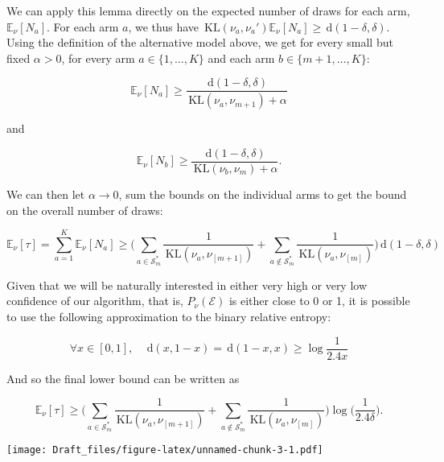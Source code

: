 \documentclass[12pt,]{article}
\newcommand{\KL}{\,\text{KL}}
\newcommand{\der}{\,\text{d}}
\begin{document}
We can apply this lemma directly on the expected number of draws for
each arm, \(\mathbb{E}_{\nu}[N_a]\). For each arm \(a\), we thus have
\(\KL(\nu_a, \nu_a') \mathbb{E}_{\nu}[N_a] \geq \der (1-\delta, \delta)\).
Using the definition of the alternative model above, we get for every
small but fixed \(\alpha > 0\), for every arm \(a \in \{1, \dots, K\}\)
and each arm \(b \in \{m+1, \dots, K\}\):

\begin{equation*}
\mathbb{E}_{\nu}[N_a] \geq \frac{\der(1-\delta, \delta)}{\KL (\nu_a, \nu_{m+1}) + \alpha}
\end{equation*}

and

\begin{equation*}
\mathbb{E}_{\nu}[N_b] \geq \frac{\der(1-\delta, \delta)}{\KL (\nu_b, \nu_{m}) + \alpha}.
\end{equation*}

We can then let \(\alpha \to 0\), sum the bounds on the individual arms
to get the bound on the overall number of draws:

\begin{equation*}
\mathbb{E}_{\nu}[\tau] = \sum_{a=1}^K \mathbb{E}_{\nu}[N_a] \geq \Big( \sum_{a \in \mathcal{S}_m^*} \frac{1}{\KL(\nu_a, \nu_{[m+1]})} + \sum_{a \notin \mathcal{S}_m^*} \frac{1}{\KL(\nu_a, \nu_{[m]})} \Big) \der(1-\delta, \delta)
\end{equation*}

Given that we will be naturally interested in either very high or very
low confidence of our algorithm, that is, \(P_\nu(\mathcal{E})\) is
either close to 0 or 1, it is possible to use the following
approximation to the binary relative entropy:

\begin{equation}\label{bre_approx}
\forall x \in [0,1], \quad \der(x,1-x) = \der(1-x,x) \geq \log \frac{1}{2.4x}
\end{equation}

And so the final lower bound can be written as

\begin{equation*}
\mathbb{E}_{\nu}[\tau] \geq \Big( \sum_{a \in \mathcal{S}_m^*} \frac{1}{\KL(\nu_a, \nu_{[m+1]})} + \sum_{a \notin \mathcal{S}_m^*} \frac{1}{\KL(\nu_a, \nu_{[m]})} \Big) \log \big(\frac{1}{2.4\delta} \big).
\end{equation*}

\texttt{[image: Draft\_files/figure-latex/unnamed-chunk-3-1.pdf]}
\end{document}
